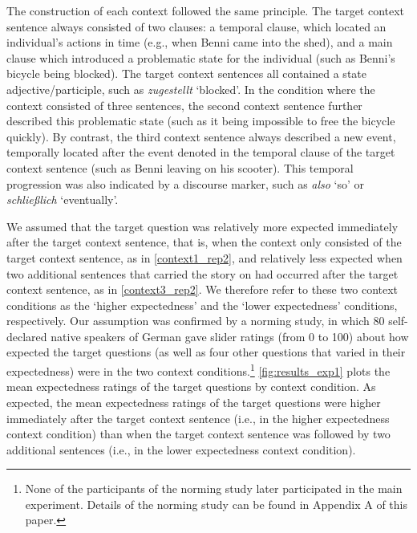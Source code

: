 \documentclass{salt}
\begin{document}
The construction of each context followed the same principle. The target context sentence always consisted of two clauses: a temporal clause, which located an individual's actions in time (e.g., when Benni came into the shed), and a main clause which introduced a problematic state for the individual (such as Benni's bicycle being blocked). The target context sentences all contained a state adjective/participle, such as {\em zugestellt} `blocked'. In the condition where the context consisted of three sentences, the second context sentence further described this problematic state (such as it being impossible to free the bicycle quickly). By contrast, the third context sentence always described a new event, temporally located after the event denoted in the temporal clause of the target context sentence (such as Benni leaving on his scooter). This temporal progression was also indicated by a discourse marker, such as {\em also} `so' or {\em schließlich} `eventually'.

We assumed that the target question was relatively more expected immediately after the target context sentence, that is, when the context only consisted of the target context sentence, as in \ref{context1_rep2}, and relatively less expected when two additional sentences that carried the story on had occurred after the target context sentence, as in \ref{context3_rep2}. We therefore refer to these two context conditions as the `higher expectedness' and the `lower expectedness' conditions, respectively. Our assumption was confirmed by a norming study, in which 80 self-declared native speakers of German gave slider ratings (from 0 to 100) about how expected the target questions (as well as four other questions that varied in their expectedness) were in the two context conditions.\footnote{None of the participants of the norming study later participated in the main experiment. Details of the norming study can be found in Appendix A of this paper.} \autoref{fig:results_exp1} plots the mean expectedness ratings of the target questions by context condition. As expected, the mean expectedness ratings of the target questions were higher immediately after the target context sentence (i.e., in the higher expectedness context condition) than when the target context sentence was followed by two additional sentences (i.e., in the lower expectedness context condition).
\end{document}
